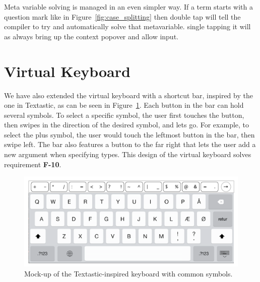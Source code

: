 Meta variable solving is managed in an even simpler way. If a term starts with
a question mark like in Figure~\ref{fig:case_splitting} then double tap will
tell the compiler to try and automatically solve that metavariable. single tapping it will as always
bring up the context popover and allow input.

\section{Virtual Keyboard}
\label{subsec:virtual_keyboard}
We have also extended the virtual keyboard with a shortcut bar, inspired by the one in Textastic, as can be seen in Figure~\ref{fig:design_keyboard}.
Each button in the bar can hold several symbols.
To select a specific symbol, the user first touches the button, then swipes in the direction of the desired symbol, and lets go.
For example, to select the plus symbol, the user would touch the leftmost button in the bar, then swipe left.
The bar also features a button to the far right that lets the user add a new argument when specifying types. 
This design of the virtual keyboard solves requirement \textbf{F-10}. 

\begin{figure}
	\centering
		\includegraphics[width=115mm]{diagrams/design_keyboard.pdf}
	\caption{Mock-up of the Textastic-inspired keyboard with common symbols.}
\label{fig:design_keyboard}
\end{figure}

